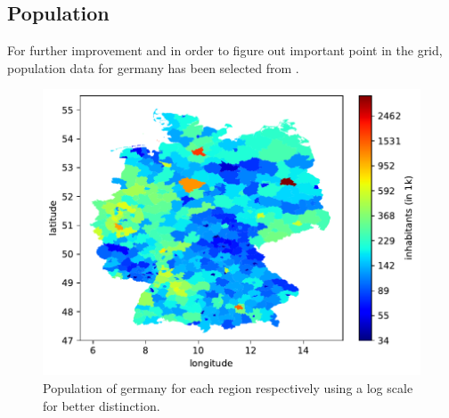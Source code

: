 \subsection{Population}

For further improvement and in order to figure out important point in the grid, population data for germany has been  selected from .\\

\begin{figure}[h!]%
\centering
\includegraphics[width=\textwidth]{plots/demo/demo2018_logscale}%
\caption{Population of germany for each region respectively using a log scale for better distinction.}%
\label{fig:demo2018_logscale}%
\end{figure}




